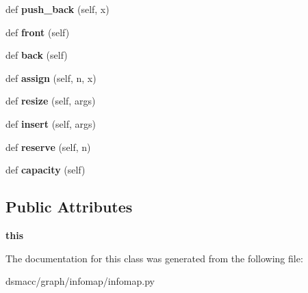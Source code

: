 \begin{DoxyCompactItemize}
def {\bfseries push\+\_\+back} (self, x)
\item 
\mbox{\label{classdsmacc_1_1graph_1_1infomap_1_1infomap_1_1StringVector_aa1ba2fe1eb7aa02f98192611a784ac80}} 
def {\bfseries front} (self)
\item 
\mbox{\label{classdsmacc_1_1graph_1_1infomap_1_1infomap_1_1StringVector_a657bc0e5d251458b7830e093e3ccdd98}} 
def {\bfseries back} (self)
\item 
\mbox{\label{classdsmacc_1_1graph_1_1infomap_1_1infomap_1_1StringVector_aa096e1df2b8cf67dc6114f0b60a7de8c}} 
def {\bfseries assign} (self, n, x)
\item 
\mbox{\label{classdsmacc_1_1graph_1_1infomap_1_1infomap_1_1StringVector_a72c9cb9e569cce90d27c41146e4bc734}} 
def {\bfseries resize} (self, args)
\item 
\mbox{\label{classdsmacc_1_1graph_1_1infomap_1_1infomap_1_1StringVector_abfee7b5333c1aca3f7cbc914e9feb20b}} 
def {\bfseries insert} (self, args)
\item 
\mbox{\label{classdsmacc_1_1graph_1_1infomap_1_1infomap_1_1StringVector_af5b59b057dd94248fb1ccc31edb01238}} 
def {\bfseries reserve} (self, n)
\item 
\mbox{\label{classdsmacc_1_1graph_1_1infomap_1_1infomap_1_1StringVector_a3df69abf067f21ac5372e5a1314e4f2d}} 
def {\bfseries capacity} (self)
\end{DoxyCompactItemize}
\subsection*{Public Attributes}
\begin{DoxyCompactItemize}
\item 
\mbox{\label{classdsmacc_1_1graph_1_1infomap_1_1infomap_1_1StringVector_a8eb67c8a5e72b879da2cf061754c96e0}} 
{\bfseries this}
\end{DoxyCompactItemize}


The documentation for this class was generated from the following file\+:\begin{DoxyCompactItemize}
\item 
dsmacc/graph/infomap/infomap.\+py\end{DoxyCompactItemize}
